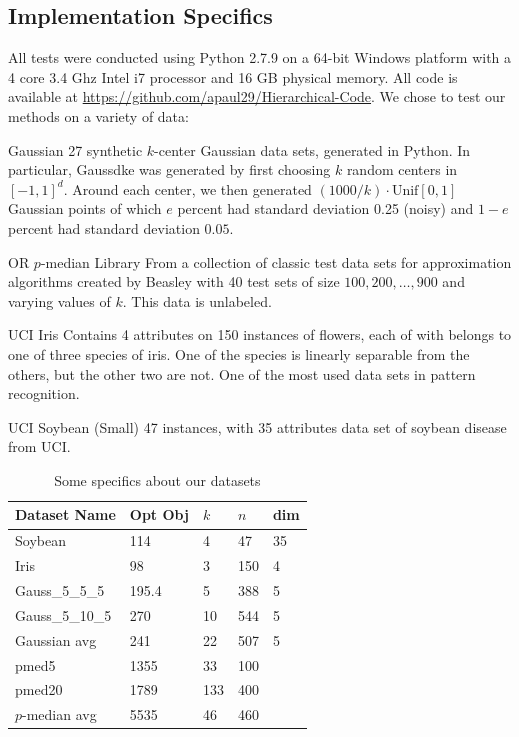 \documentclass[conference, 10pt, final]{IEEEtran}
\begin{document}
\subsection{Implementation Specifics}

All tests were conducted using Python 2.7.9 on a 64-bit Windows platform with a 4 core 3.4 Ghz Intel i7 processor and 16 GB physical memory. All code is available at \url{https://github.com/apaul29/Hierarchical-Code}.
We chose to test our methods on a variety of data:
\begin{LaTeXdescription}
\item[Gaussian] 27 synthetic $k$-center Gaussian data sets, generated in Python. In particular, Gauss\textunderscore d\textunderscore k\textunderscore e was generated by first choosing $k$ random centers in $[-1,1]^d$. Around each center, we then generated $(1000/k) \cdot \mathrm{Unif}[0,1]$ Gaussian points of which $e$ percent had standard deviation 0.25 (noisy) and $1-e$ percent had standard deviation $0.05$. 
\item[OR $p$-median Library] \cite{Beasley} From a collection of classic test data sets for approximation algorithms created by Beasley with 40 test sets of size $100, 200, \ldots, 900$ and varying values of $k$. This data is unlabeled.
\item[UCI Iris] \cite{Iris} Contains 4 attributes on 150 instances of flowers, each of with belongs to one of three species of iris.  One of the species is linearly separable from the others, but the other two are not.  One of the most used data sets in pattern recognition.
\item[UCI Soybean (Small)] \cite{Soybean} 47 instances, with 35 attributes data set of soybean disease from UCI.
\end{LaTeXdescription} 

\begin{table}[!t]
\caption{Some specifics about our datasets}
\label{table_specifics}
\centering
\begin{tabular}{ | l | l | l | l | l | }
\hline
 Dataset Name & Opt Obj & $k$ & $n$ & dim \\ \hline
Soybean & 114 & 4 & 47 & 35 \\ 
Iris & 98 & 3 & 150 & 4 \\ 
Gauss\_5\_5\_5 & 195.4 & 5 & 388 & 5 \\ 
Gauss\_5\_10\_5 & 270 & 10 & 544 & 5 \\ 
Gaussian avg & 241 & 22 & 507 & 5 \\ 
pmed5 & 1355 & 33 & 100 & \  \\ 
pmed20 & 1789 & 133 & 400 & \  \\ 
$p$-median avg & 5535 & 46 & 460 & \  \\ \hline
 \end{tabular}
\end{table}
\end{document}
